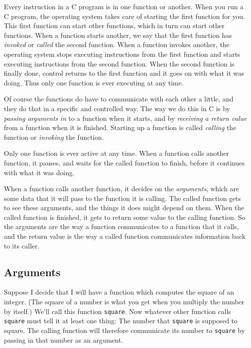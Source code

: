     Every instruction in a C program is in one function or another.
When you run a C program, the operating system takes care of starting
the first function for you.  This first function can start other
functions, which in turn can start other functions.  When a function
starts another, we say that the first function has {\em invoked}\/ or
{\em called}\/ the second function.  When a function invokes another,
the operating system stops executing instructions from the first
function and starts executing instructions from the second function.
When the second function is finally done, control returns to the first
function and it goes on with what it was doing.  Thus only one function
is ever executing at any time.

    Of course the functions do have to communicate with each other a
little, and they do that in a specific and controlled way.  The way we
do this in C is by {\em passing arguments in}\/ to a function when it
starts, and by {\em receiving a return value} from a function when it is
finished.  Starting up a function is called {\em calling}\/ the
function or {\em invoking}\/ the function.

    Only one function is ever active at any time.  When a function calls
another function, it pauses, and waits for the called function to
finish, before it continues with what it was doing.

    When a function calls another function, it decides on the {\em
arguments}, which are some data that it will pass to the function it is
calling.  The called function gets to see these arguments, and the
things it does might depend on them.  When the called function is
finished, it gets to return some value to the calling function.  So the
arguments are the way a function communicates to a function that it
calls, and the return value is the way a called function communicates
information back to its caller.

\subsection{Arguments}

   Suppose I decide that I will have a function which computes the
square of an integer.  (The square of a number is what you get when you
multiply the number by itself.)  We'll call this function {\tt square}.
Now whatever other function calls {\tt square} must tell it at least one
thing: The number that {\tt square} is supposed to square.  The calling
function will therefore communicate its number to {\tt square} by
passing in that number as an argument.

